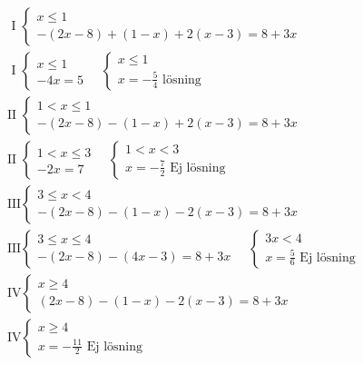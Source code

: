 \begin{multicols}{2}
\begin{align*}
&\quad \text{ I } \left\{ \begin{array} { l } { x \leq 1 } \\ { - ( 2 x - 8 ) + ( 1 - x ) + 2 ( x - 3 ) = 8 + 3 x } \end{array} \right. \\
&\quad \text{ I } \left\{ \begin{array} { l } { x \leq 1 } \\ { - 4 x = 5 } \end{array}  \quad \left\{ \begin{array} { l } { x \leq 1 } \\ { x = - \frac { 5 } { 4 } \text{ lösning}} \end{array} \right. \right. \\
&\quad \text{II } \left\{ \begin{array} { l } { 1 < x \leq 1 } \\ { - ( 2 x - 8 ) - ( 1 - x ) + 2 ( x - 3 ) = 8 + 3 x } \end{array} \right. \\
&\quad \text{II } \left\{ \begin{array} { l } { 1 < x \leq 3 } \\ { - 2 x = 7 } \end{array} \quad \left\{ \begin{array} { l } { 1 < x < 3 } \\ { x = - \frac { 7 } { 2 } \text{ Ej lösning} } \end{array} \right. \right. \\
&\quad \text{III} \left\{ \begin{array} { l } { 3 \leq x < 4 } \\ { - ( 2 x - 8 ) - ( 1 - x ) - 2 ( x - 3 ) = 8 + 3 x } \end{array} \right. \\
&\quad \text{III} \left\{ \begin{array} { l } { 3 \leq x \leq 4 } \\ { - ( 2 x - 8 ) - ( 4 x - 3 ) = 8 + 3 x } \end{array} \quad \left\{ \begin{array} { l } { 3x < 4 } \\ { x = \frac { 5 } { 6 } \text{ Ej lösning} } \end{array} \right. \right. \\
&\quad \text{IV} \left\{ \begin{array} { l } { x \geq 4 } \\ { ( 2 x - 8 ) - ( 1 - x ) - 2 ( x - 3 ) = 8 + 3 x } \end{array} \right. \\
&\quad \text{IV} \left\{ \begin{array} { l } { x \geq 4 } \\ { x = - \frac { 11 } { 2 } \text{ Ej lösning} } \end{array} \right. \\ 
\end{align*}



\end{multicols}

